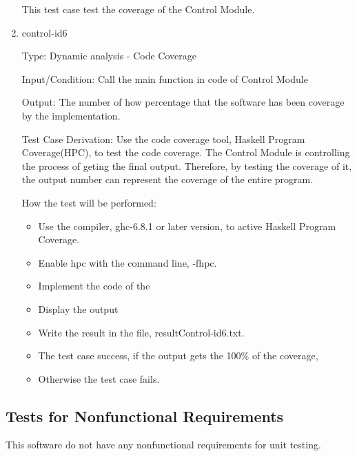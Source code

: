 \documentclass[12pt, titlepage]{article}
\begin{document}
\begin{enumerate}
This test case test the coverage of the Control Module.

\item{control-id6\\}

Type: Dynamic analysis - Code Coverage 


Input/Condition: Call the main function in code of Control Module

Output: The number of how percentage that the software has been coverage by the implementation.

Test Case Derivation: Use the code coverage tool, Haskell Program Coverage(HPC), to test the code coverage. The Control Module is controlling the process of geting the final output. Therefore, by testing the coverage of it, the output number can represent the coverage of the entire program.

How the test will be performed:

\begin{itemize} 
\item Use the compiler, ghc-6.8.1 or later version, to active Haskell Program
Coverage.
\item Enable hpc with the command line, -fhpc.
\item Implement the code of the \progname
\item Display the output
\item Write the result in the file, resultControl-id6.txt.
\item The test case success, if the output gets the 100\% of the coverage,
\item Otherwise the test case fails. 
\end{itemize}

\end{enumerate} 




\subsection{Tests for Nonfunctional Requirements}

This software do not have any nonfunctional requirements for unit testing.


\end{document}

